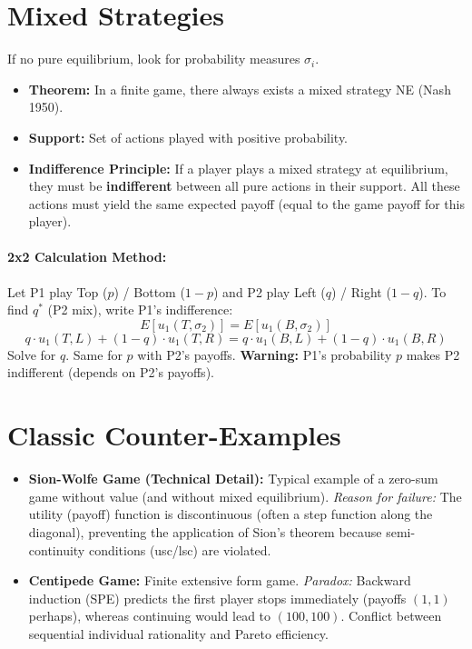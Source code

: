 \documentclass[10pt,a4paper]{article}
\begin{document}
\section{Mixed Strategies}
If no pure equilibrium, look for probability measures $\sigma_i$.
\begin{itemize}
    \item \textbf{Theorem:} In a finite game, there always exists a mixed strategy NE (Nash 1950).
    \item \textbf{Support:} Set of actions played with positive probability.
    \item \textbf{Indifference Principle:} If a player plays a mixed strategy at equilibrium, they must be \textbf{indifferent} between all pure actions in their support. All these actions must yield the same expected payoff (equal to the game payoff for this player).
\end{itemize}

\paragraph{2x2 Calculation Method:}
Let P1 play Top ($p$) / Bottom ($1-p$) and P2 play Left ($q$) / Right ($1-q$).
To find $q^*$ (P2 mix), write P1's indifference:
\[ E[u_1(T, \sigma_2)] = E[u_1(B, \sigma_2)] \]
\[ q \cdot u_1(T,L) + (1-q) \cdot u_1(T,R) = q \cdot u_1(B,L) + (1-q) \cdot u_1(B,R) \]
Solve for $q$. Same for $p$ with P2's payoffs.
\textbf{Warning:} P1's probability $p$ makes P2 indifferent (depends on P2's payoffs).

\section{Classic Counter-Examples}
\begin{itemize}
    \item \textbf{Sion-Wolfe Game (Technical Detail):} Typical example of a zero-sum game without value (and without mixed equilibrium).
    \textit{Reason for failure:} The utility (payoff) function is discontinuous (often a step function along the diagonal), preventing the application of Sion's theorem because semi-continuity conditions (usc/lsc) are violated.
    \item \textbf{Centipede Game:} Finite extensive form game.
    \textit{Paradox:} Backward induction (SPE) predicts the first player stops immediately (payoffs $(1,1)$ perhaps), whereas continuing would lead to $(100,100)$. Conflict between sequential individual rationality and Pareto efficiency.
\end{itemize}
\end{document}
